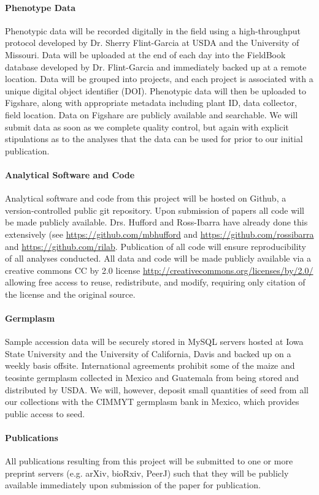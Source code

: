 \paragraph{Phenotype Data} 
Phenotypic data will be recorded digitally in the field using a high-throughput protocol developed by Dr. Sherry Flint-Garcia at USDA and the University of Missouri.  Data will be uploaded at the end of each day into the FieldBook database developed by Dr. Flint-Garcia and immediately backed up at a remote location. Data will be grouped into projects, and each project is associated with a unique digital object identifier (DOI).  Phenotypic data will then be uploaded to Figshare, along with appropriate metadata including plant ID, data collector, field location. 
Data on Figshare are publicly available and searchable.  We will submit data as soon as we complete quality control, but again with explicit stipulations as to the analyses that the data can be used for prior to our initial publication. 

\paragraph{Analytical Software and Code} 
Analytical software and code from this project will be hosted on Github, a version-controlled public git repository.  Upon submission of papers all code will be made publicly available.  Drs. Hufford and Ross-Ibarra have already done this extensively (see \url{https://github.com/mbhufford} and \url{https://github.com/rossibarra} and \url{https://github.com/rilab}. Publication of all code will ensure reproducibility of all analyses conducted.  All data and code will be made publicly available via a creative commons CC by 2.0 license \url{http://creativecommons.org/licenses/by/2.0/} allowing free access to reuse, redistribute, and modify, requiring only citation of the license and the original source.

\paragraph{Germplasm} 
Sample accession data will be securely stored in MySQL servers hosted at Iowa State University and the University of California, Davis and backed up on a weekly basis offsite.  International agreements prohibit some of the maize and teosinte germplasm collected in Mexico and Guatemala from being stored and distributed by USDA.  We will, however, deposit small quantities of seed from all our collections with the CIMMYT germplasm bank in Mexico, which provides public access to seed.

\paragraph{Publications} 
All publications resulting from this project will be submitted to one or more preprint servers (e.g. arXiv, bioRxiv, PeerJ) such that they will be publicly available immediately upon submission of the paper for publication.